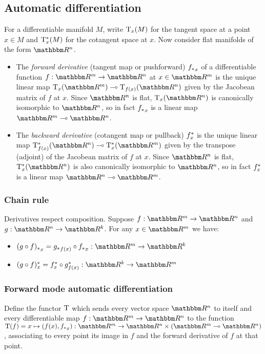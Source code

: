 \subsection{Automatic differentiation}
\label{sec:auto-diff}

For a differentiable manifold $M$, write $\mathrm{T}_x(M)$ for the tangent space at a point $x \in M$ and
$\mathrm{T}^*_x(M)$ for the cotangent space at $x$. Now consider flat manifolds of the form $\RR^n$.

\begin{itemize}
\item The \emph{forward derivative} (tangent map or pushforward) ${f_{*}}_x$ of a differentiable function
$f: \RR^m \to \RR^n$ at $x \in \RR^m$ is the unique linear map $\tangents_x(\RR^m) \linearto
\tangents_{f(x)}(\RR^n)$ given by the Jacobean matrix of $f$ at $x$. Since $\RR^n$ is flat,
$\tangents_x(\RR^n)$ is canonically isomorphic to $\RR^n$, so in fact ${f_{*}}_x$ is a linear map $\RR^m
\linearto \RR^n$.
\item The \emph{backward derivative} (cotangent map or pullback) $f^{*}_x$ is the unique linear map
$\cotangents_{f(x)}(\RR^n) \linearto \cotangents_x(\RR^m)$ given by the transpose (adjoint) of the Jacobean
matrix of $f$ at $x$. Since $\RR^n$ is flat, $\cotangents_x(\RR^n)$ is also canonically isomorphic to $\RR^n$,
so in fact $f^{*}_x$ is a linear map $\RR^n \linearto \RR^m$.
\end{itemize}

\subsubsection{Chain rule}

Derivatives respect composition. Suppose $f: \RR^m \to \RR^n$ and $g: \RR^n \to \RR^k$. For any $x \in \RR^m$
we have:

\begin{itemize}
\item $\pushf{(g \comp f)}_x = \pushf{g}_{f(x)} \comp \pushf{f}_x: \RR^m \to \RR^k$
\item $\pullf{(g \comp f)}_x = \pullf{f}_{x} \comp \pullf{g}_{f(x)}: \RR^k \to \RR^m$
\end{itemize}

\subsubsection{Forward mode automatic differentiation}

\begin{definition}
Define the functor $\mathrm{T}$ which sends every vector space $\RR^n$ to itself and every differentiable map
$f: \RR^m \to \RR^n$ to the function $\tangents(f) = x \mapsto (f(x), \pushf{f}_x): \RR^m \to \RR^n \times
(\RR^m \linearto \RR^n)$, associating to every point its image in $f$ and the forward derivative of $f$ at
that point.
\end{definition}

